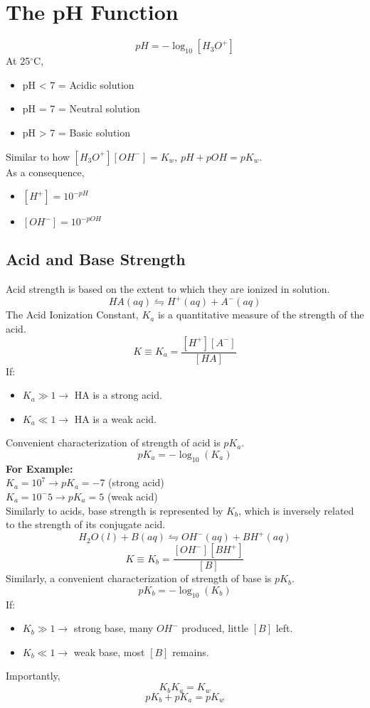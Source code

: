 \documentclass[10pt]{article}
\begin{document}
\section*{The pH Function}
\[pH = -\log_{10}[H_3O^+]\]
At 25$^\circ$C,
\begin{itemize}
    \item pH < 7 = Acidic solution
    \item pH = 7 = Neutral solution
    \item pH > 7 = Basic solution
\end{itemize}

Similar to how $[H_3O^+][OH^-] = K_w$, $pH + pOH = pK_w$.\\
As a consequence,
\begin{itemize}
    \item $[H^+] = 10^{-pH}$
    \item $[OH^-] = 10^{-pOH}$
\end{itemize}

\subsection*{Acid and Base Strength}
Acid strength is based on the extent to which they are ionized in solution.
\[HA (aq) \leftrightharpoons H^+ (aq) + A^- (aq)\]
The Acid Ionization Constant, $K_a$ is a quantitative measure of the strength of the acid.
\[K \equiv K_a = \frac{[H^+][A^-]}{[HA]}\]
If:
\begin{itemize}
    \item $K_a \gg 1 \rightarrow$ HA is a strong acid.
    \item $K_a \ll 1 \rightarrow$ HA is a weak acid.
\end{itemize}
Convenient characterization of strength of acid is $pK_a$.
\[pK_a = -\log_{10}(K_a)\]
\textbf{For Example:}\\
$K_a = 10^7 \rightarrow pK_a = -7$ (strong acid)\\
$K_a = 10^-5 \rightarrow pK_a = 5$ (weak acid) \\

\noindent Similarly to acids, base strength is represented by $K_b$, which is inversely related to the strength of its conjugate acid.
\[H_2O(l) + B(aq) \leftrightharpoons OH^- (aq) + BH^+ (aq)\]
\[K \equiv K_b = \frac{[OH^-][BH^+]}{[B]}\]
Similarly, a convenient characterization of strength of base is $pK_b$.
\[pK_b = -\log_{10}(K_b)\]
If:
\begin{itemize}
    \item $K_b \gg 1 \rightarrow$ strong base, many $OH^-$ produced, little $[B]$ left.
    \item $K_b \ll 1 \rightarrow$ weak base, most $[B]$ remains.
\end{itemize}
Importantly, 
\[K_b K_a = K_w\]
\[pK_b + pK_a = pK_w\]
\end{document}
